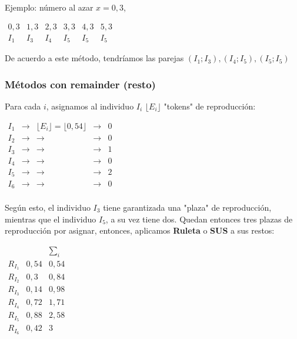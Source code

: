 \documentclass[10pt,a4paper]{article}
\begin{document}
Ejemplo: número al azar $x=0,3$,

\begin{center}
$\begin{array}{cccccc} 0,3&1,3&2,3&3,3&4,3&5,3\\ I_1&I_3&I_4&I_5&I_5&I_5 \end{array}$
\end{center}

De acuerdo a este método, tendríamos las parejas $(I_1; I_3), (I_4; I_5), (I_5;I_5)$

\subsubsection*{Métodos con remainder (resto)}

Para cada $i$, asignamos al individuo $I_i$ $\lfloor{E_i}\rfloor$ "tokens" de reproducción:

\begin{center}
$\begin{array}{ccccc} I_1 &\rightarrow &\lfloor E_i\rfloor = \lfloor 0,54\rfloor& \rightarrow & 0\\ I_2 & \rightarrow & \rightarrow &\rightarrow &0\\ I_3 & \rightarrow & \rightarrow &\rightarrow &1\\ I_4 & \rightarrow & \rightarrow &\rightarrow &0\\ I_5 & \rightarrow & \rightarrow &\rightarrow &2\\ I_6 & \rightarrow & \rightarrow &\rightarrow &0\\ \end{array}$
\end{center}

Según esto, el individuo $I_3$ tiene garantizada una "plaza" de reproducción, mientras que el individuo $I_5$, a su vez tiene dos. Quedan entonces tres plazas de reproducción por asignar, entonces, aplicamos \textbf{Ruleta} o \textbf{SUS} a sus restos:

\begin{center}
$\begin{array}{c|r|r} &&\sum\limits_{i}\\ R_{I_1} & 0,54 & 0,54\\ R_{I_2} & 0,3 & 0,84\\ R_{I_3} & 0,14 & 0,98\\ R_{I_4} & 0,72 & 1,71\\ R_{I_5} & 0,88 & 2,58\\ R_{I_6} & 0,42& 3\\ \end{array}$
\end{center}
\end{document}
